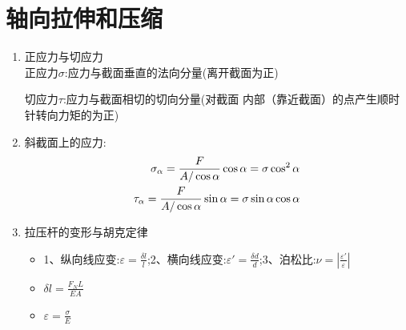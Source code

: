 \documentclass[12pt]{ctexbook}
\theoremstyle{plain}
\begin{document}
  \pagestyle{empty}


  \frontmatter
  \tableofcontents
  \pagestyle{empty}
  \pagestyle{fancy}
  \fancyhf{}%
  \fancyhead[OR]{$\cdot$~\thepage~$\cdot$}
  \fancyhead[EL]{$\cdot$~\thepage~$\cdot$}
  \clearpage{\pagestyle{empty}\cleardoublepage}
  
  \mainmatter

\chapter{轴向拉伸和压缩}
\begin{enumerate}[label={\arabic*}] 
    \item 正应力与切应力\\
    正应力$\sigma$:应力与截面垂直的法向分量(离开截面为正)

切应力$\tau $:应力与截面相切的切向分量(对截面
内部（靠近截面）的点产生顺时针转向力矩的为正)

  \item 斜截面上的应力:\\
  
\begin{align}
    \sigma_\alpha=\frac{F}{A/\cos \alpha}\cos \alpha=\sigma\cos^2 \alpha \notag\\
    \tau_\alpha=\frac{F}{A/\cos \alpha}\sin \alpha=\sigma\sin\alpha\cos\alpha \notag
\end{align}

\item 拉压杆的变形与胡克定律
\begin{itemize}
    \item 1、纵向线应变:$\varepsilon =\frac{\delta l}{l}$;2、横向线应变:$\varepsilon' =\frac{\delta d}{d}$;3、泊松比:$\nu =|\frac{\varepsilon '}{\varepsilon }|$
    \item $\delta l=\frac{F_NL}{EA}$
    \item $\varepsilon =\frac{\sigma }{E}$
\end{itemize}


\end{enumerate}
\end{document}
